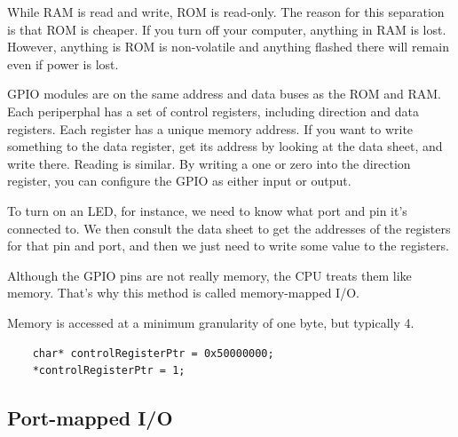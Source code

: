 While RAM is read and write, ROM is read-only. The reason for this separation
is that ROM is cheaper. If you turn off your computer, anything in RAM is lost.
However, anything is ROM is non-volatile and anything flashed there will remain
even if power is lost.

GPIO modules are on the same address and data buses as the ROM and RAM. Each
periperphal has a set of control registers, including direction and data registers.
Each register has a unique memory address. If you want to write something
to the data register, get its address by looking at the data sheet, and write
there. Reading is similar. By writing a one or zero into the direction register,
you can configure the GPIO as either input or output.

To turn on an LED, for instance, we need to know what port and pin it's connected
to. We then consult the data sheet to get the addresses of the registers for
that pin and port, and then we just need to write some value to the registers.

Although the GPIO pins are not really memory, the CPU treats them like memory.
That's why this method is called memory-mapped I/O.

Memory is accessed at a minimum granularity of one byte, but typically 4.

\begin{lstlisting}
    char* controlRegisterPtr = 0x50000000;
    *controlRegisterPtr = 1;
\end{lstlisting}

\subsection{Port-mapped I/O}
